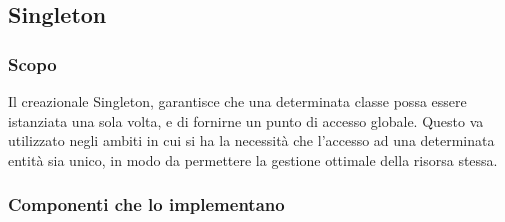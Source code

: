 \subsection{Singleton}

\subsubsection{Scopo}
Il  creazionale Singleton, garantisce che una determinata classe possa essere istanziata una sola volta, e di fornirne un punto di accesso globale. Questo  va utilizzato negli ambiti in cui si ha la necessità che l'accesso ad una determinata entità sia unico, in modo da permettere la gestione ottimale della risorsa stessa.

\subsubsection{Componenti che lo implementano}
